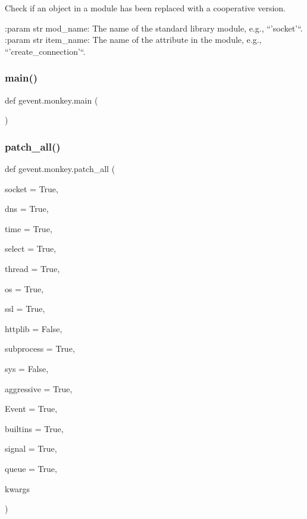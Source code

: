 \begin{DoxyVerb}Check if an object in a module has been replaced with a
cooperative version.

:param str mod_name: The name of the standard library module,
    e.g., ``'socket'``.
:param str item_name: The name of the attribute in the module,
    e.g., ``'create_connection'``.\end{DoxyVerb}
 \mbox{\label{namespacegevent_1_1monkey_a34e6151272ef3946238fd34ea5b8f643}} 
\subsubsection{\texorpdfstring{main()}{main()}}
{\footnotesize\ttfamily def gevent.\+monkey.\+main (\begin{DoxyParamCaption}{ }\end{DoxyParamCaption})}

\mbox{\label{namespacegevent_1_1monkey_a260d359ce3b17b34391adbab15f59a34}} 
\subsubsection{\texorpdfstring{patch\+\_\+all()}{patch\_all()}}
{\footnotesize\ttfamily def gevent.\+monkey.\+patch\+\_\+all (\begin{DoxyParamCaption}\item[{}]{socket = {\ttfamily True},  }\item[{}]{dns = {\ttfamily True},  }\item[{}]{time = {\ttfamily True},  }\item[{}]{select = {\ttfamily True},  }\item[{}]{thread = {\ttfamily True},  }\item[{}]{os = {\ttfamily True},  }\item[{}]{ssl = {\ttfamily True},  }\item[{}]{httplib = {\ttfamily False},  }\item[{}]{subprocess = {\ttfamily True},  }\item[{}]{sys = {\ttfamily False},  }\item[{}]{aggressive = {\ttfamily True},  }\item[{}]{Event = {\ttfamily True},  }\item[{}]{builtins = {\ttfamily True},  }\item[{}]{signal = {\ttfamily True},  }\item[{}]{queue = {\ttfamily True},  }\item[{}]{kwargs }\end{DoxyParamCaption})}

